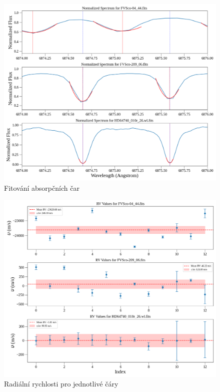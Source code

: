 \documentclass[a4paper,11pt,twocolumn]{article}
\begin{document}
    \begin{figure}
        \centering
        \includegraphics[width=1\textwidth]{spectra_lines.png}
        \caption{Fitování absorpčních čar}
        \label{fig:spectra_lines}
    \end{figure}

    \begin{figure}
        \centering
        \includegraphics[width=1\textwidth]{rv_values.png}
        \caption{Radiální rychlosti pro jednotlivé čáry}
        \label{fig:rv_values}
    \end{figure}
\end{document}
